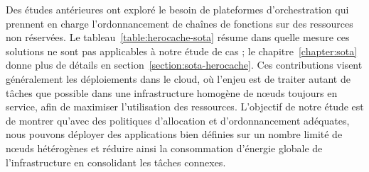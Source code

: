 \begin{table}[!ht]
    \centering
        \caption{État de l'art des plateformes d'orchestration prenant en compte les données.}
    \label{table:herocache-sota}
\end{table}

Des études antérieures ont exploré le besoin de plateformes d'orchestration qui prennent en charge l'ordonnancement de chaînes de fonctions sur des ressources non réservées. Le tableau~\ref{table:herocache-sota} résume dans quelle mesure ces solutions ne sont pas applicables à notre étude de cas ; le chapitre~\ref{chapter:sota} donne plus de détails en section~\ref{section:sota-herocache}. Ces contributions visent généralement les déploiements dans le cloud, où l'enjeu est de traiter autant de tâches que possible dans une infrastructure homogène de nœuds toujours en service, afin de maximiser l'utilisation des ressources. L'objectif de notre étude est de montrer qu'avec des politiques d'allocation et d'ordonnancement adéquates, nous pouvons déployer des applications bien définies sur un nombre limité de nœuds hétérogènes et réduire ainsi la consommation d'énergie globale de l'infrastructure en consolidant les tâches connexes.

